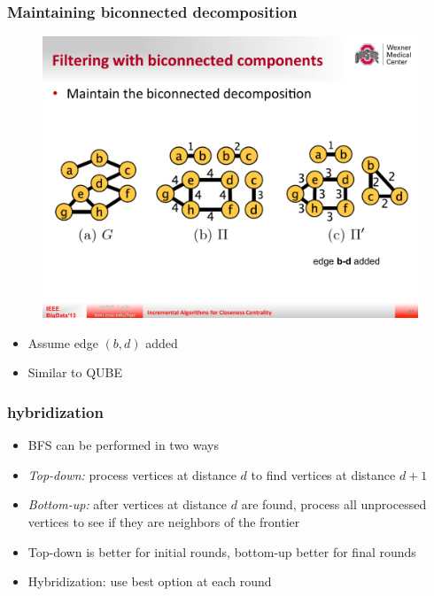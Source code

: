 \begin{frame}
  \frametitle{Maintaining biconnected decomposition}

  \begin{figure}[H]
    \centering
    \includegraphics[width=\textwidth, height=0.5\textheight, keepaspectratio]{imgs/sksc-bidecomp}
  \end{figure}

  \begin{itemize}
    \item Assume edge $(b,d)$ added
    \item Similar to QUBE
  \end{itemize}
\end{frame}


\begin{frame}
  \frametitle{\sssp hybridization}

  \begin{itemize}
    \item BFS can be performed in two ways
    \item \emph{Top-down:} process vertices at distance $d$ to find vertices at distance $d+1$
    \item \emph{Bottom-up:} after vertices at distance $d$ are found, process all unprocessed vertices to see if they are neighbors of the frontier
    \item Top-down is better for initial rounds, bottom-up better for final rounds
    \item Hybridization: use best option at each round
  \end{itemize}
\end{frame}


